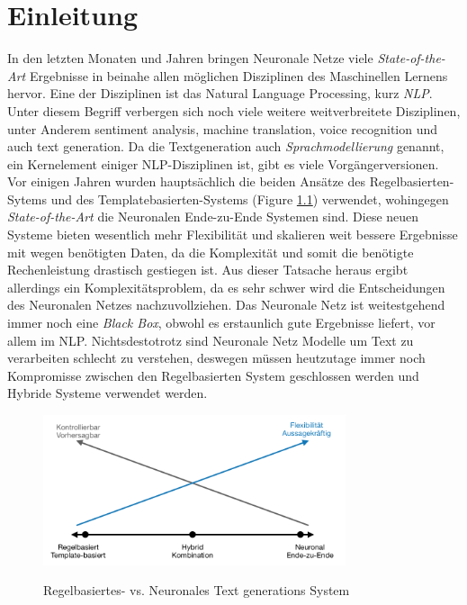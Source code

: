 \chapter{Einleitung}\label{ch:intro}

In den letzten Monaten und Jahren bringen Neuronale Netze viele \textit{State-of-the-Art} Ergebnisse in beinahe allen möglichen Disziplinen des Maschinellen Lernens hervor. Eine der Disziplinen ist das Natural Language Processing, kurz \textit{NLP}. Unter diesem Begriff verbergen sich noch viele weitere weitverbreitete Disziplinen, unter Anderem sentiment analysis, machine translation, voice recognition und auch text generation. Da die Textgeneration auch \textit{Sprachmodellierung} genannt, ein Kernelement einiger NLP-Disziplinen ist, gibt es viele Vorgängerversionen. Vor einigen Jahren wurden hauptsächlich die beiden Ansätze des Regelbasierten-Sytems und des Templatebasierten-Systems (Figure \ref{rules_based}) verwendet, wohingegen \textit{State-of-the-Art} die Neuronalen Ende-zu-Ende Systemen sind.  Diese neuen Systeme bieten wesentlich mehr Flexibilität und skalieren weit bessere Ergebnisse mit wegen benötigten Daten, da die Komplexität und somit die benötigte Rechenleistung drastisch gestiegen ist. Aus dieser Tatsache heraus ergibt allerdings ein Komplexitätsproblem, da es sehr schwer wird die Entscheidungen des Neuronalen Netzes nachzuvollziehen. Das Neuronale Netz ist weitestgehend immer noch eine \textit{Black Box}, obwohl es erstaunlich gute Ergebnisse liefert, vor allem im NLP. Nichtsdestotrotz sind Neuronale Netz Modelle um Text zu verarbeiten schlecht zu verstehen, deswegen müssen heutzutage immer noch Kompromisse zwischen den Regelbasierten System geschlossen werden und Hybride Systeme verwendet werden. 

\begin{figure}
  \begin{center}
  \includegraphics[width=3.5in]{photos/regel_basiert}\\
  \caption{Regelbasiertes- vs. Neuronales Text generations System}\label{rules_based}
  \end{center}
\end{figure}

